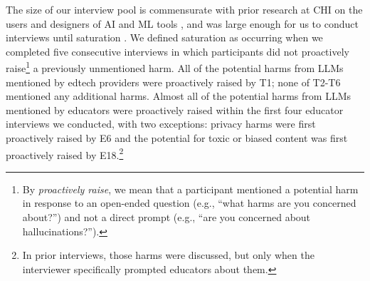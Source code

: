 The size of our interview pool is commensurate with prior research at CHI on the users and designers of AI and ML tools \cite[e.g.,][]{veale_fairness_2018, chordia_deceptive_2023, scheuerman_products_2024, jin_beyond_2024}, and was large enough for us to conduct interviews until saturation \cite{small_2009_how, hennink_sample_2022}. We defined saturation as occurring when we completed five consecutive interviews in which participants did not proactively raise\footnote{By \textit{proactively raise}, we mean that a participant mentioned a potential harm in response to an open-ended question (e.g., ``what harms are you concerned about?'') and not a direct prompt (e.g., ``are you concerned about hallucinations?'').} a previously unmentioned harm. All of the potential harms from LLMs mentioned by edtech providers were proactively raised by T1; none of T2-T6 mentioned any additional harms. Almost all of the potential harms from LLMs mentioned by educators were proactively raised within the first four educator interviews we conducted, with two exceptions: privacy harms were first proactively raised by E6 and the potential for toxic or biased content was first proactively raised by E18.\footnote{In prior interviews, those harms were discussed, but only when the interviewer specifically prompted educators about them.}


